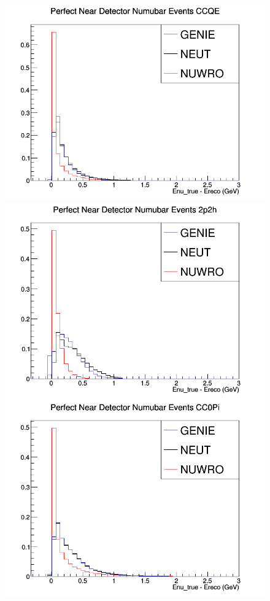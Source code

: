 \documentclass[12pt]{article}
\begin{document}
\begin{figure}[h]
\centering
{}
\includegraphics[width=\linewidth]{Ereco_Etrue/numubar_perfect_ND_CCQE.png}
\endminipage
{}
\includegraphics[width=\linewidth]{Ereco_Etrue/numubar_perfect_ND_2p2h.png}
\endminipage
{}
\includegraphics[width=\linewidth]{Ereco_Etrue/numubar_perfect_ND_CC0Pi.png}

\end{figure}
\end{document}
